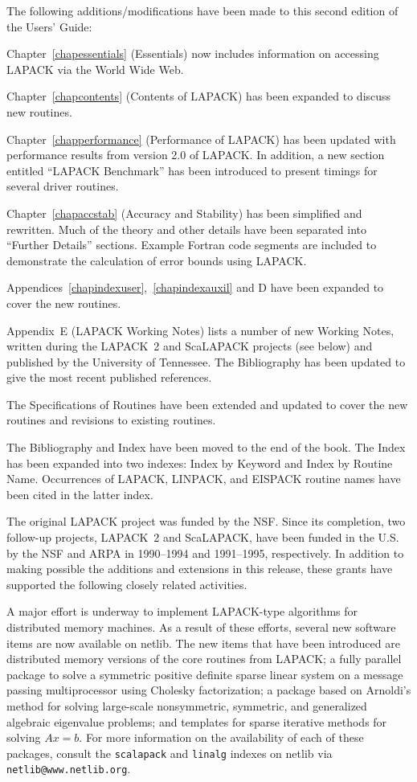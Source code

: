 The following additions/modifications have been made to this second edition
of the Users' Guide:

Chapter~\ref{chapessentials} (Essentials) 
now includes information on accessing LAPACK via the World
Wide Web.

Chapter~\ref{chapcontents} (Contents of LAPACK) has been expanded to discuss
new routines.

Chapter~\ref{chapperformance} (Performance of LAPACK) has been updated
with performance results from version 2.0 of LAPACK.  In addition,
a new section entitled ``LAPACK Benchmark'' has been introduced to
present timings for several driver routines.

Chapter~\ref{chapaccstab} (Accuracy and Stability) has been simplified and
rewritten.
Much of the theory and other details have been separated into
``Further Details'' sections.  Example Fortran code segments are
included to demonstrate the calculation of error bounds using LAPACK.

Appendices~\ref{chapindexuser},~\ref{chapindexauxil} and D have
been expanded to cover the new routines.

Appendix~E (LAPACK Working Notes) lists a number of new
Working Notes, written during the LAPACK~2 and ScaLAPACK 
projects (see below) and published by the University of Tennessee.
The Bibliography has been updated to give
the most recent published references.

The Specifications of Routines have been extended and updated to cover
the new routines and revisions to existing routines.

The Bibliography and Index have been moved to the end of the book.
The Index has been expanded into two indexes:  Index by Keyword and
Index by Routine Name.  Occurrences of LAPACK, LINPACK, and EISPACK
routine names have been cited in the latter index.

The original LAPACK project was funded by the NSF. Since its completion,
two follow-up projects, LAPACK~2 and ScaLAPACK, have been funded in the
U.S. by the NSF and ARPA in 1990--1994 and 1991--1995, respectively.  
In addition to making possible
the additions and extensions in this release, these grants have 
supported the following closely related activities.

A major effort is underway
to implement LAPACK-type algorithms for distributed memory
 machines.
As a result of these efforts,
several new software items are now available on netlib.  The new
items that have been introduced are distributed memory versions of the
core routines from LAPACK; a fully parallel package to solve a symmetric
positive definite sparse linear system on a message passing
multiprocessor using Cholesky factorization; a package based on
Arnoldi's method for solving large-scale nonsymmetric, symmetric, and
generalized algebraic eigenvalue problems; 
and templates for sparse
iterative methods for solving $Ax=b$.
For more information on the
availability of each of these packages, consult the {\tt scalapack}
and {\tt linalg} indexes on netlib via {\tt netlib@www.netlib.org}.


